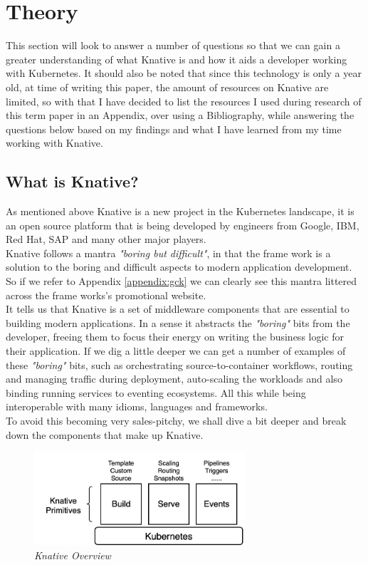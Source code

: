 \section{Theory}
This section will look to answer a number of questions so that we can gain a greater understanding of what Knative is and how it aids a developer working with Kubernetes. It should also be noted that since this technology is only a year old, at time of writing this paper, the amount of resources on Knative are limited, so with that I have decided to list the resources I used during research of this term paper in an Appendix, over using a Bibliography, while answering the questions below based on my findings and what I have learned from my time working with Knative.
\subsection{What is Knative?}
As mentioned above Knative is a new project in the Kubernetes landscape, it is an open source platform that is being developed by engineers from Google, IBM, Red Hat, SAP and many other major players.
\\Knative follows a mantra \textit{"boring but difficult"}, in that the frame work is a solution to the boring and difficult aspects to modern application development. So if we refer to Appendix \ref{appendix:gck} we can clearly see this mantra littered across the frame works's promotional website. 
\\It tells us that Knative is a set of middleware components that are essential to building modern applications. In a sense it abstracts the \textit{"boring"} bits from the developer, freeing them to focus their energy on writing the business logic for their application. If we dig a little deeper we can get a number of examples of these \textit{"boring"} bits, such as orchestrating source-to-container workflows, routing and managing traffic during deployment, auto-scaling the workloads and also binding running services to eventing ecosystems. All this while being interoperable with many idioms, languages and frameworks. 
\\To avoid this becoming very sales-pitchy, we shall dive a bit deeper and break down the components that make up Knative.
\begin{figure}[!ht]
\centering
\includegraphics*[width=0.7\textwidth]{images/knative-overview.png}
\caption{\em Knative Overview}
\label{img:knative-overview}
\end{figure}
